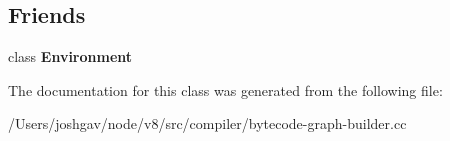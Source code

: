 \subsection*{Friends}
\begin{DoxyCompactItemize}
\item 
class {\bfseries Environment}\hypertarget{classv8_1_1internal_1_1compiler_1_1_bytecode_graph_builder_1_1_frame_state_before_and_after_ad07f4de926e4e68b49b17ab4d13369d3}{}\label{classv8_1_1internal_1_1compiler_1_1_bytecode_graph_builder_1_1_frame_state_before_and_after_ad07f4de926e4e68b49b17ab4d13369d3}

\end{DoxyCompactItemize}


The documentation for this class was generated from the following file\+:\begin{DoxyCompactItemize}
\item 
/\+Users/joshgav/node/v8/src/compiler/bytecode-\/graph-\/builder.\+cc\end{DoxyCompactItemize}
